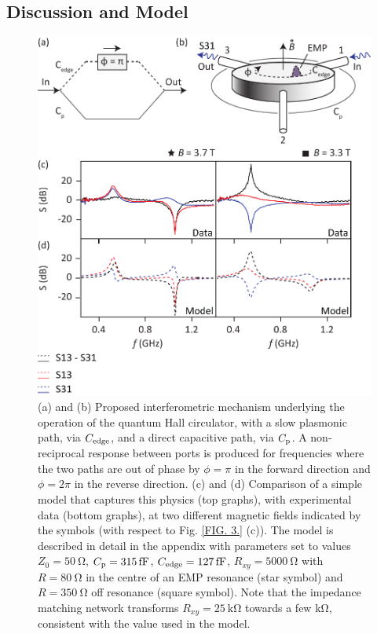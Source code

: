 \subsection{Discussion and Model}
\begin{figure}
\includegraphics[width=0.7\columnwidth]{fig4_QH}
\caption[Comparison of data and model]{\label{FIG. 4.}
(a) and (b) Proposed interferometric mechanism underlying the operation of the quantum Hall circulator, with a slow plasmonic path, via $C_{\rm edge}$, and a direct capacitive path, via $C_{\rm p}$. A non-reciprocal response between ports is produced for frequencies where the two paths are out of phase by $\phi = \pi$ in the forward direction and $\phi = 2\pi$ in the reverse direction.
(c) and (d) Comparison of a simple model that captures this physics (top graphs), with experimental data (bottom graphs), at two different magnetic fields indicated by the symbols (with respect to Fig. \ref{FIG. 3.} (c)). The model is described in detail in the appendix with parameters set to values $Z_0 = \SI{50}{\ohm}$, $C_{\rm p} = \SI{315}{\femto\farad}$, $C_{\rm edge} = \SI{127}{\femto\farad}$, $R_{xy} = \SI{5000}{\ohm}$ with $R = \SI{80}{\ohm}$ in the centre of an EMP resonance (star symbol) and $R = \SI{350}{\ohm}$ off resonance (square symbol). Note that the impedance matching network transforms $R_{xy} = \SI{25}{\kilo\ohm}$ towards a few \si{\kilo\ohm}, consistent with the value used in the model.}
\end{figure}

